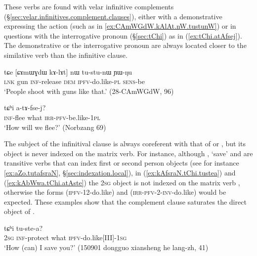 These verbs are found with velar infinitive complements (§\ref{sec:velar.infinitives.complement.clauses}), either with a demonstrative expressing the action (such as  in \ref{ex:CAmWGdW.kAlAt.nW.tustunW}) or in questions with the interrogative pronoun  (§\ref{sec:tChi}) as in (\ref{ex:tChi.atAfsej}). The demonstrative or the interrogative pronoun are always located closer to the similative verb than the infinitive clause.

\begin{exe}
\ex \label{ex:CAmWGdW.kAlAt.nW.tustunW}
 \gll tɕe [ɕɤmɯɣdɯ kɤ-lɤt] nɯ tu-stu-nɯ ɲɯ-ŋu \\
 \textsc{lnk} gun \textsc{inf}-release \textsc{dem} \textsc{ipfv}-do.like-\textsc{pl} \textsc{sens}-be \\
 \glt `People shoot with guns like that.' (28-CAmWGdW, 96)
\end{exe}

 \begin{exe}
\ex \label{ex:tChi.atAfsej}
\gll  [kɤ-pʰɣo] tɕʰi a-tɤ-fse-j?    \\
\textsc{inf}-flee what \textsc{irr}-\textsc{pfv}-be.like-\textsc{1pl} \\
\glt  `How will we flee?' (Norbzang 69)
\end{exe} 

The subject of the infinitival clause is always coreferent with that of  or , but its object is never indexed on the matrix verb. For instance, although , `save' and  are transitive verbs that can index first or second person objects (see for instance \ref{ex:aZo.tutafsraN}, §\ref{sec:indexation.local}), in (\ref{ex:kAfsraN.tChi.tustea}) and (\ref{ex:kAbWwa.tChi.atAste})  the \textsc{2sg} object is not indexed on the matrix verb , otherwise the forms  (\textsc{ipfv}-1\fl{}2-do.like) and  (\textsc{irr}-\textsc{pfv}-2-\textsc{inv}-do.like) would be expected. These examples show that the complement clause saturates the direct object of .

 \begin{exe}
\ex \label{ex:kAfsraN.tChi.tustea}
 tɕʰi tu-ste-a? \\
\textsc{2sg} \textsc{inf}-protect what \textsc{ipfv}-do.like[III]-\textsc{1sg} \\
\glt `How (can) I save you?' (150901 dongguo xiansheng he lang-zh, 41)
\end{exe} 

